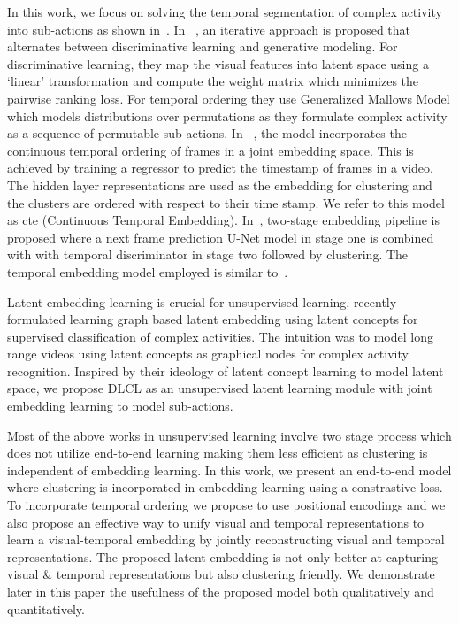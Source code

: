 \documentclass[final]{cvpr}
\begin{document}
\par In this work, we focus on solving the temporal segmentation of complex activity into sub-actions as shown in~\cite{sener2018unsupervised, kukleva2019unsupervised, vidalmata2020joint}.
In ~\cite{sener2018unsupervised}, an iterative approach is proposed that alternates between discriminative learning and generative modeling. 
For discriminative learning, they map the visual features into latent space using a `linear' transformation and compute the weight matrix which minimizes the pairwise ranking loss. For temporal ordering they use Generalized Mallows Model which models distributions over permutations as they formulate complex activity as a sequence of permutable sub-actions. In ~\cite{kukleva2019unsupervised}, the model incorporates the continuous temporal ordering of frames in a joint embedding space. This is achieved by training a regressor to predict the timestamp of frames in a video. The hidden layer representations are used as the embedding for clustering and the clusters are ordered with respect to their time stamp. We refer to this model as {\sc cte} (Continuous Temporal Embedding). In~\cite{vidalmata2020joint}, two-stage embedding pipeline is proposed where a next frame prediction U-Net model in stage one is combined with  with temporal discriminator in stage two followed by clustering. The temporal embedding model employed is similar to~\cite{kukleva2019unsupervised}.

\par Latent embedding learning is crucial for unsupervised learning, recently~\cite{hussein2019videograph} formulated learning graph based latent embedding using latent concepts for supervised classification of complex activities. The intuition was to model long range videos using latent concepts as graphical nodes for complex activity recognition. Inspired by their ideology of latent concept learning to model latent space, we propose DLCL as an unsupervised latent learning module with joint embedding learning to model sub-actions.


\par Most of the above works in unsupervised learning involve two stage process which does not utilize end-to-end learning making them less efficient as clustering is independent of embedding learning. In this work, we present an end-to-end model where clustering is incorporated in embedding learning using a constrastive loss. To incorporate temporal ordering we propose to use positional encodings and we also propose an effective way to unify visual and temporal representations to learn a visual-temporal embedding by jointly reconstructing visual and temporal representations.
The proposed latent embedding is not only better at capturing visual \& temporal representations but also clustering friendly. 
We demonstrate later in this paper the usefulness of the proposed model both qualitatively and quantitatively. 
\end{document}
